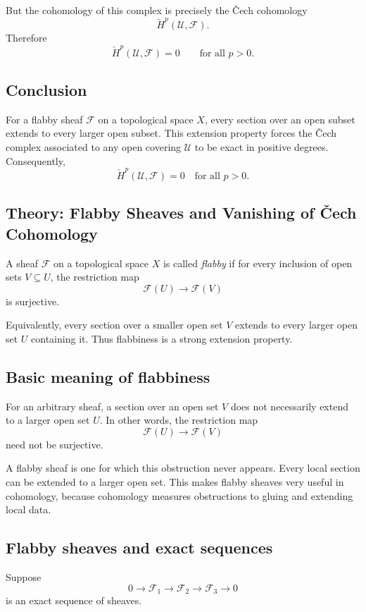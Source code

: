 But the cohomology of this complex is precisely the \v{C}ech cohomology
\[
\check H^p(\mathcal U,\mathcal F).
\]
Therefore
\[
\check H^p(\mathcal U,\mathcal F)=0
\qquad
\text{for all }p>0.
\]

\subsection{Conclusion}

For a flabby sheaf $\mathcal F$ on a topological space $X$, every section
over an open subset extends to every larger open subset. This extension
property forces the \v{C}ech complex associated to any open covering
$\mathcal U$ to be exact in positive degrees. Consequently,
\[
\boxed{
	\check H^p(\mathcal U,\mathcal F)=0
	\quad\text{for all }p>0.
}
\]
\subsection*{Theory: Flabby Sheaves and Vanishing of \v{C}ech Cohomology}

A sheaf $\mathcal F$ on a topological space $X$ is called \emph{flabby}
if for every inclusion of open sets $V\subseteq U$, the restriction map
\[
\mathcal F(U)\longrightarrow \mathcal F(V)
\]
is surjective.

Equivalently, every section over a smaller open set $V$ extends to every
larger open set $U$ containing it. Thus flabbiness is a strong extension
property.

\subsection*{Basic meaning of flabbiness}

For an arbitrary sheaf, a section over an open set $V$ does not necessarily
extend to a larger open set $U$. In other words, the restriction map
\[
\mathcal F(U)\to \mathcal F(V)
\]
need not be surjective.

A flabby sheaf is one for which this obstruction never appears. Every local
section can be extended to a larger open set. This makes flabby sheaves very
useful in cohomology, because cohomology measures obstructions to gluing and
extending local data.

\subsection*{Flabby sheaves and exact sequences}

Suppose
\[
0\longrightarrow \mathcal F_1
\longrightarrow \mathcal F_2
\longrightarrow \mathcal F_3
\longrightarrow 0
\]
is an exact sequence of sheaves.

